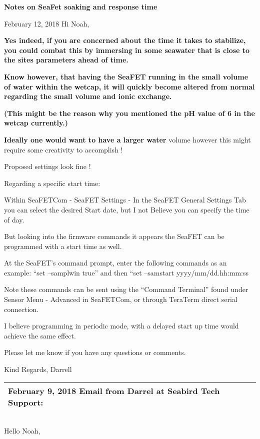\documentclass[]{book}
\begin{document}
\textbf{Notes on SeaFet soaking and response time}

February 12, 2018 Hi Noah,

\textbf{Yes indeed, if you are concerned about the time it takes to
stabilize, you could combat this by immersing in some seawater that is
close to the sites parameters ahead of time.}

\textbf{Know however, that having the SeaFET running in the small volume
of water within the wetcap, it will quickly become altered from normal
regarding the small volume and ionic exchange.}

\textbf{(This might be the reason why you mentioned the pH value of 6 in
the wetcap currently.)}

\textbf{Ideally one would want to have a larger water} volume however
this might require some creativity to accomplish !

Proposed settings look fine !

Regarding a specific start time:

Within SeaFETCom - SeaFET Settings - In the SeaFET General Settings Tab
you can select the desired Start date, but I not Believe you can specify
the time of day.

But looking into the firmware commands it appears the SeaFET can be
programmed with a start time as well.

At the SeaFET's command prompt, enter the following commands as an
example: ``set --samplwin true'' and then ``set --samstart
yyyy/mm/dd.hh:mm:ss

Note these commands can be sent using the ``Command Terminal'' found
under Sensor Menu - Advanced in SeaFETCom, or through TeraTerm direct
serial connection.

I believe programming in periodic mode, with a delayed start up time
would achieve the same effect.

Please let me know if you have any questions or comments.

Kind Regards, Darrell

\begin{longtable}[]{@{}l@{}}
\toprule
February 9, 2018 Email from Darrel at Seabird Tech
Support:\tabularnewline
\midrule
\endhead
\bottomrule
\end{longtable}

\begin{longtable}[]{@{}l@{}}
\toprule
\bottomrule
\end{longtable}

Hello Noah,
\end{document}
